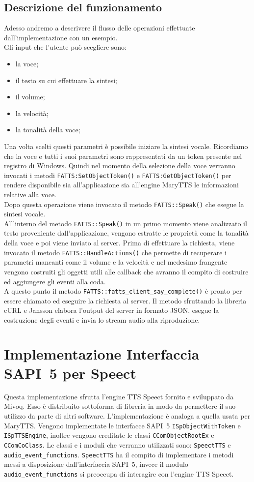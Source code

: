 \subsection{Descrizione del funzionamento}
Adesso andremo a descrivere il flusso delle operazioni effettuate dall'implementazione con un esempio.\\
Gli input che l'utente può scegliere sono:
\begin{itemize}
	\item la voce;
	\item il testo su cui effettuare la sintesi;
	\item il volume;
	\item la velocità;
	\item la tonalità della voce;
\end{itemize}
Una volta scelti questi parametri è possibile iniziare la sintesi vocale. Ricordiamo che la voce e tutti i suoi parametri sono rappresentati da un token presente nel registro di Windows.
Quindi nel momento della selezione della voce verranno invocati i metodi \texttt{FATTS:SetObjectToken()} e \texttt{FATTS:GetObjectToken()} per rendere disponibile sia all'applicazione sia all'engine MaryTTS le informazioni relative alla voce.\\
Dopo questa operazione viene invocato il metodo \texttt{FATTS::Speak()} che esegue la sintesi vocale.\\
All'interno del metodo \texttt{FATTS::Speak()} in un primo momento viene analizzato il testo proveniente dall'applicazione, vengono estratte le proprietà come la tonalità della voce e poi viene inviato al server.
Prima di effettuare la richiesta, viene invocato il metodo \texttt{FATTS::HandleActions()} che permette di recuperare i parametri mancanti come il volume e la velocità e nel medesimo frangente vengono costruiti gli oggetti utili alle callback che avranno il compito di costruire ed aggiungere gli eventi alla coda.\\
A questo punto il metodo \texttt{FATTS::fatts\_client\_say\_complete()} è pronto per essere chiamato ed eseguire la richiesta al server.
Il metodo sfruttando la libreria cURL e Jansson elabora l'output del server in formato JSON, esegue la costruzione degli eventi e invia lo stream audio alla riproduzione.

\newpage
\section{Implementazione Interfaccia SAPI~5 per Speect}
Questa implementazione sfrutta l'engine TTS Speect fornito e sviluppato da Mivoq. Esso è distribuito sottoforma di libreria in modo da permettere il suo utilizzo da parte di altri software.
L'implementazione è analoga a quella usata per MaryTTS. Vengono implementate le interfacce SAPI~5 \texttt{ISpObjectWithToken} e \texttt{ISpTTSEngine}, inoltre vengono ereditate le classi \texttt{CComObjectRootEx} e \texttt{CComCoClass}.
Le classi e i moduli che verranno utilizzati sono: \texttt{SpeectTTS} e \texttt{audio\_event\_functions}.
\texttt{SpeectTTS} ha il compito di implementare i metodi messi a disposizione dall'interfaccia SAPI~5, invece il modulo \texttt{audio\_event\_functions} si preoccupa di interagire con l'engine TTS Speect.
